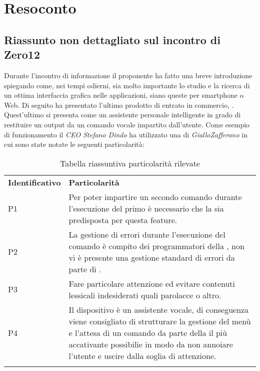 \clearpage
\section{Resoconto}
	\subsection{Riassunto non dettagliato sul incontro di Zero12}
	\label{sec:riassunto}
	Durante l'incontro di informazione il proponente ha fatto una breve introduzione spiegando come, nei tempi odierni, sia molto importante lo studio e la ricerca di un ottima interfaccia grafica nelle applicazioni, siano queste per smartphone o Web. 
	Di seguito ha presentato l'ultimo prodotto di  entrato in commercio,  . Quest'ultimo si presenta come un assistente personale intelligente in grado di restituire un output da un comando vocale impartito dall'utente. 
	Come esempio di funzionamento il \emph{CEO Stefano Dindo} ha utilizzato una  di \emph{GialloZafferano} in cui sono state notate le seguenti particolarità:
	
	\begin{center}
		\renewcommand{\arraystretch}{1.5}
		\begin{longtable}{  p{3cm} p{11.2cm} }
			\rowcolor{tableHeadYellow}
			\textbf{Identificativo}&\textbf{Particolarità}\\
			P1 & Per poter impartire un secondo comando durante l'esecuzione del primo è necessario che la \markg{skill} sia predisposta per questa feature.\\
			P2 & La gestione di errori durante l'esecuzione del comando è compito dei programmatori della \markg{skill}, non vi è presente una gestione standard di errori da parte di \markg{Alexa}.\\
			P3 & Fare particolare attenzione ed evitare contenuti lessicali indesiderati quali parolacce o altro.\\
			P4 & Il dispositivo è un assistente vocale, di conseguenza viene consigliato di strutturare la gestione del menù e l'attesa di un comando da parte della \markg{skill} il più accativante possibilie in modo da non annoiare l'utente e uscire dalla soglia di attenzione.\\
			\rowcolor{white}
			\caption{Tabella riassuntiva particolarità rilevate}
		\end{longtable}	
	\end{center}
	\clearpage
